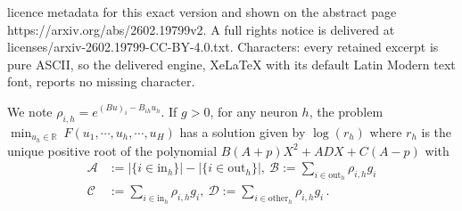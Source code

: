 \documentclass[10pt,a4paper]{amsart}
\def\R{{\mathbb{R}}}
\newcommand{\Ah}{\mathcal{A}}
\newcommand{\Bh}{\mathcal{B}}
\newcommand{\Ch}{\mathcal{C}}
\newcommand{\Dh}{\mathcal{D}}
\newcommand{\inh}{{\mathrm{in}_h}}
\newcommand{\otherh}{{\mathrm{other}_h}}
\newcommand{\outh}{{\mathrm{out}_h}}
\begin{document}
licence metadata for this exact version and shown on the abstract page https://arxiv.org/abs/2602.19799v2. A full rights notice is delivered at licenses/arxiv-2602.19799-CC-BY-4.0.txt. Characters: every retained excerpt is pure ASCII, so the delivered engine, XeLaTeX with its default Latin Modern text font, reports no missing character.
\begin{lemma}
\label{lemma:calculate_degree_pol_2}
We note $\rho_{i,h} = e^{(Bu)_i-
B_{ih} u_{h}
 }$. 
If $g > 0$, for any neuron $h$, the problem $\min_{u_h \in \R} \ F(u_1, \cdots, u_h, \cdots, u_H)$ has a solution given 
by $\log(r_h)$ where $r_h$ is the unique positive root of the polynomial 
$B(A + p) X^2 + A D X + C(A-p)$ with 
\begin{equation*}
\begin{split}
\Ah &:= |\{i \in \inh\}| - |\{i \in \outh\}|, \ \Bh := \sum_{i \in \outh} \rho_{i,h} g_i \\
\Ch &:= \sum_{i \in \inh} \rho_{i,h} g_i, \ \Dh := \sum_{i \in \otherh} \rho_{i,h} g_i\,.
\end{split}
\end{equation*}
\end{lemma}
\end{document}
